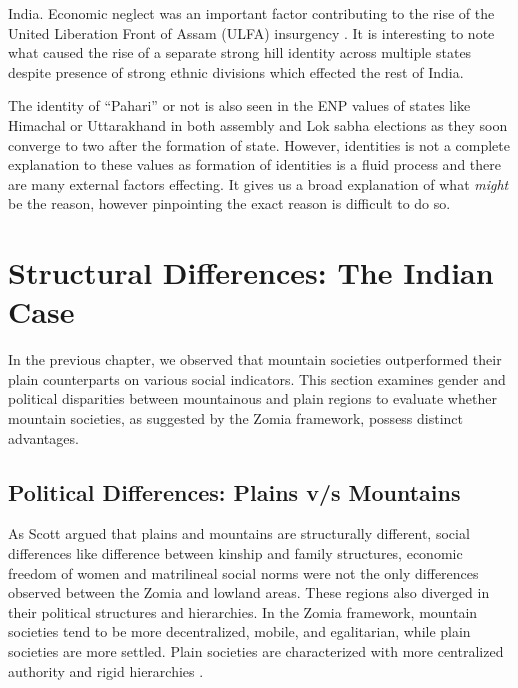 \begin{sloppypar}
India. Economic neglect was an important factor contributing to the rise of the United Liberation Front of Assam (ULFA) insurgency \citep{chima2023insurgency}. It is interesting to note what caused the rise of a separate strong hill identity across multiple states despite presence of strong ethnic divisions which effected the rest of India. 
    
\end{sloppypar}

The identity of ``Pahari'' or not is also seen in the ENP values of states like Himachal or Uttarakhand in both assembly and Lok sabha elections as they soon converge to two after the formation of state. However, identities is not a complete explanation to these values as formation of identities is a fluid process and there are many external factors effecting. It gives us a broad explanation of what \textit{might} be the reason, however pinpointing the exact reason is difficult to do so.
 



\section{Structural Differences: The Indian Case}
\begin{sloppypar}
    
 In the previous chapter, we observed that mountain societies outperformed their plain counterparts on various social indicators. This section examines gender and political disparities between mountainous and plain regions to evaluate whether mountain societies, as suggested by the Zomia framework, possess distinct advantages.
\end{sloppypar}

\subsection{Political Differences: Plains v/s Mountains}
As Scott argued that plains and mountains are structurally different, social differences like difference between kinship and family structures, economic freedom of women and matrilineal social norms were not the only differences observed between the Zomia and lowland areas. These regions also diverged in their political structures and hierarchies. In the Zomia framework, mountain societies tend to be more decentralized, mobile, and egalitarian, while plain societies are more settled. Plain societies are characterized with more centralized authority and rigid hierarchies \citep{Hammond_2011}.

